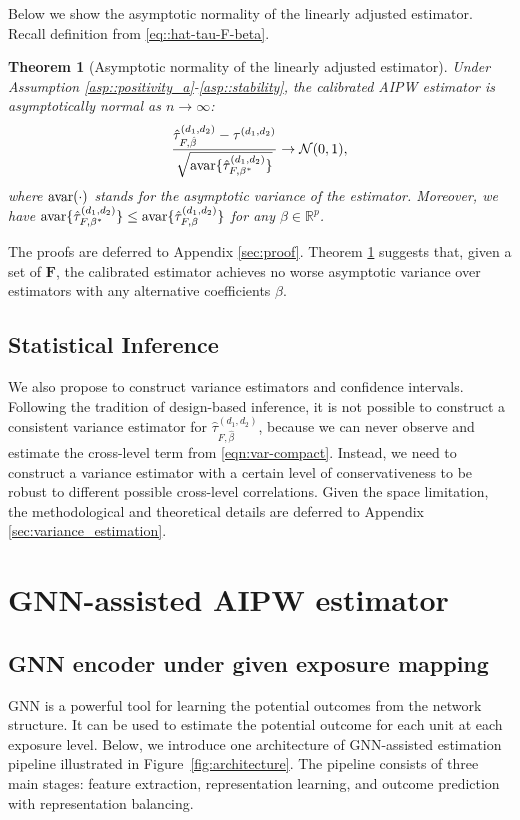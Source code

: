 \documentclass{article}
\theoremstyle{plain}
\newtheorem{theorem}{Theorem}[section]
\theoremstyle{definition}
\theoremstyle{remark}
\newcommand{\avar}{\textup{avar}}
\newcommand{\bF}{\boldsymbol{F}}
\newcommand{\cN}{\mathcal{N}}
\begin{document}
Below we show the asymptotic normality of the linearly adjusted estimator. Recall definition from \eqref{eq::hat-tau-F-beta}. 
\begin{theorem}[Asymptotic normality of the linearly adjusted estimator]\label{thm:normality}
    Under Assumption \ref{asp::positivity_a}-\ref{asp::stability}, the calibrated AIPW estimator is asymptotically normal as $n\to\infty$:
    \begin{eqnarray*}
        \frac{\hat\tau^{(d_1,d_2)}_{F, \hat{\beta}} - \tau^{(d_1,d_2)}}{\sqrt{\avar\{\hat\tau^{(d_1,d_2)}_{F, \beta^*}\}}} \rightarrow \cN(0, 1), 
    \end{eqnarray*}
    where $\avar(\cdot)$ stands for the asymptotic variance of the estimator. Moreover, we have $\avar\{\hat\tau^{(d_1,d_2)}_{F, \beta^*}\} \le \avar\{\hat\tau^{(d_1,d_2)}_{F, \beta}\}$ for any $\beta \in \mathbb{R}^p$.
\end{theorem}

The proofs are deferred to Appendix \ref{sec:proof}. Theorem \ref{thm:normality} suggests that, given a set of $\bF$, the calibrated estimator achieves no worse asymptotic variance over estimators with any alternative coefficients $\beta$. 


\subsection{Statistical Inference}

We also propose to construct variance estimators and confidence intervals. Following the tradition of design-based inference, it is not possible to construct a consistent variance estimator for $\hat\tau^{(d_1, d_2)}_{F, \hat\beta}$, because we can never observe and estimate the cross-level term from \eqref{eqn:var-compact}. Instead, we need to construct a variance estimator with a certain level of conservativeness to be robust to different possible cross-level correlations. Given the space limitation, the methodological and theoretical details are deferred to Appendix \ref{sec:variance_estimation}.




\section{GNN-assisted AIPW estimator}\label{sec::g-aipw}

\subsection{GNN encoder under given exposure mapping}
GNN is a powerful tool for learning the potential outcomes from the network structure. It can be used to estimate the potential outcome for each unit at each exposure level. Below, we introduce one architecture of GNN-assisted estimation pipeline illustrated in Figure~\ref{fig:architecture}. The pipeline consists of three main stages: feature extraction, representation learning, and outcome prediction with representation balancing.
\end{document}
